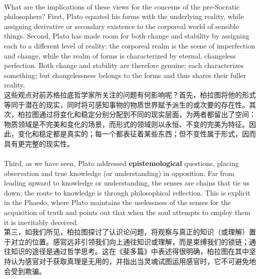 \documentclass{article}
\begin{document}
\\
What are the implications of these views for the concerns of the pre-Socratic philosophers? First, Plato equated his forms with the underlying reality, while assigning derivative or secondary existence to the corporeal world of sensible things. Second, Plato has made room for both change and stability by assigning each to a different level of reality: the corporeal realm is the scene of imperfection and change, while the realm of forms is characterized by eternal, changeless perfection. Both change and stability are therefore genuine; each characterizes something; but changelessness belongs to the forms and thus shares their fuller reality.\\
这些观点对前苏格拉底哲学家所关注的问题有何影响呢？首先，柏拉图将他的形式等同于潜在的现实，同时将可感知事物的物质世界赋予派生的或次要的存在性。其次，柏拉图通过将变化和稳定分别分配到不同的现实层面，为两者都留出了空间：物质领域是不完美和变化的场景，而形式的领域则以永恒、不变的完美为特征。因此，变化和稳定都是真实的；每一个都表征着某些东西；但不变性属于形式，因而具有更完整的现实性。\\

\\
Third, as we have seen, Plato addressed \textbf{epistemological} questions, placing observation and true knowledge (or understanding) in opposition. Far from leading upward to knowledge or understanding, the senses are chains that tie us down; the route to knowledge is through philosophical reflection. This is explicit in the Phaedo, where Plato maintains the uselessness of the senses for the acquisition of truth and points out that when the soul attempts to employ them it is inevitably deceived.\\
第三，如我们所见，柏拉图探讨了认识论问题，将观察与真正的知识（或理解）置于对立的位置。感官远非引领我们向上通往知识或理解，而是束缚我们的锁链；通往知识的途径是通过哲学思考。这在《斐多篇》中表述得很明确，柏拉图在其中坚持认为感官对于获取真理是无用的，并指出当灵魂试图运用感官时，它不可避免地会受到欺骗。\\
\end{document}
